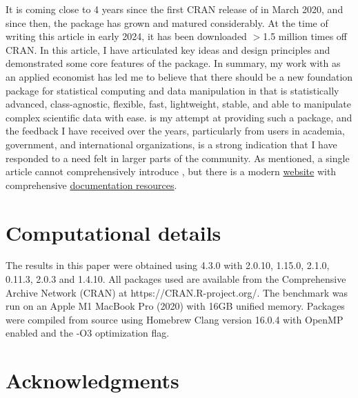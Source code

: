 \documentclass[article]{jss}
\begin{document}
It is coming close to 4 years since the first CRAN release of  in March 2020, and since then, the package has grown and matured considerably. At the time of writing this article in early 2024, it has been downloaded $>$1.5 million times off CRAN. In this article, I have articulated key ideas and design principles and demonstrated some core features of the package. In summary, my work with  as an applied economist has led me to believe that there should be a new foundation package for statistical computing and data manipulation in  that is statistically advanced, class-agnostic, flexible, fast, lightweight, stable, and able to manipulate complex scientific data with ease.  is my attempt at providing such a package, and the feedback I have received over the years, particularly from users in academia, government, and international organizations, is a strong indication that I have responded to a need felt in larger parts of the  community. As mentioned, a single article cannot comprehensively introduce , but there is a modern \href{https://sebkrantz.github.io/collapse/index.html}{website} with comprehensive \href{https://sebkrantz.github.io/collapse/articles/collapse_documentation.html}{documentation resources}.



\section*{Computational details}
The results in this paper were obtained using  \citep{R} 4.3.0 with  2.0.10,  1.15.0,  2.1.0,  0.11.3,  \citep{rmagrittr} 2.0.3 and  \citep{rmicrobenchmark} 1.4.10. All packages used are available from the Comprehensive  Archive Network (CRAN) at https://CRAN.R-project.org/. The benchmark was run on an Apple M1 MacBook Pro (2020) with 16GB unified memory. Packages were compiled from source using Homebrew Clang version 16.0.4 with OpenMP enabled and the -O3 optimization flag.

\section*{Acknowledgments}
\end{document}
